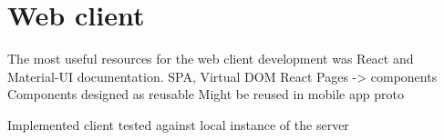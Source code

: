 
\section{Web client}\label{sec:web-client}

The most useful resources for the web client development was React and Material-UI documentation.\cite{react, material}
SPA, Virtual DOM
React Pages -> components
Components designed as reusable
Might be reused in mobile app proto

Implemented client tested against local instance of the server
